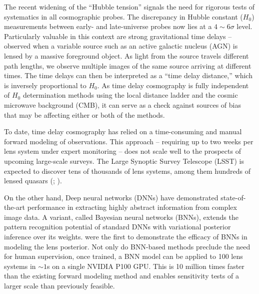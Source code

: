 The recent widening of the ``Hubble tension'' signals the need for rigorous tests of systematics in all cosmographic probes. The discrepancy in Hubble constant ($H_0$) measurements between early- and late-universe probes now lies at a $4 \sim 6\sigma$ level.  Particularly valuable in this context are strong gravitational time delays -- observed when a variable source such as an active galactic nucleus (AGN) is lensed by a massive foreground object. As light from the source travels different path lengths, we observe multiple images of the same source arriving at different times. The time delays can then be interpreted as a ``time delay distance,'' which is inversely proportional to $H_0$. As time delay cosmography is fully independent of $H_0$ determination methods using the local distance ladder and the cosmic microwave background (CMB), it can serve as a check against sources of bias that may be affecting either or both of the methods. 

To date, time delay cosmography has relied on a time-consuming and manual forward modeling of observations. This approach -- requiring up to two weeks per lens system under expert monitoring -- does not scale well to the prospects of upcoming large-scale surveys. The Large Synoptic Survey Telescope (LSST) is expected to discover tens of thousands of lens systems, among them hundreds of lensed quasars (\cite{collett2015population}; \cite{oguri2010gravitationally}).

On the other hand, Deep neural networks (DNNs) have demonstrated state-of-the-art performance in extracting highly abstract information from complex image data. A variant, called Bayesian neural networks (BNNs), extends the pattern recognition potential of standard DNNs with variational posterior inference over its weights. \cite{hezaveh2017fast} were the first to demonstrate the efficacy of BNNs in modeling the lens posterior. Not only do BNN-based methods preclude the need for human supervision, once trained, a BNN model can be applied to 100 lens systems in $\sim 1$s on a single NVIDIA P100 GPU. This is 10 million times faster than the existing forward modeling method and enables sensitivity tests of a larger scale than previously feasible.

